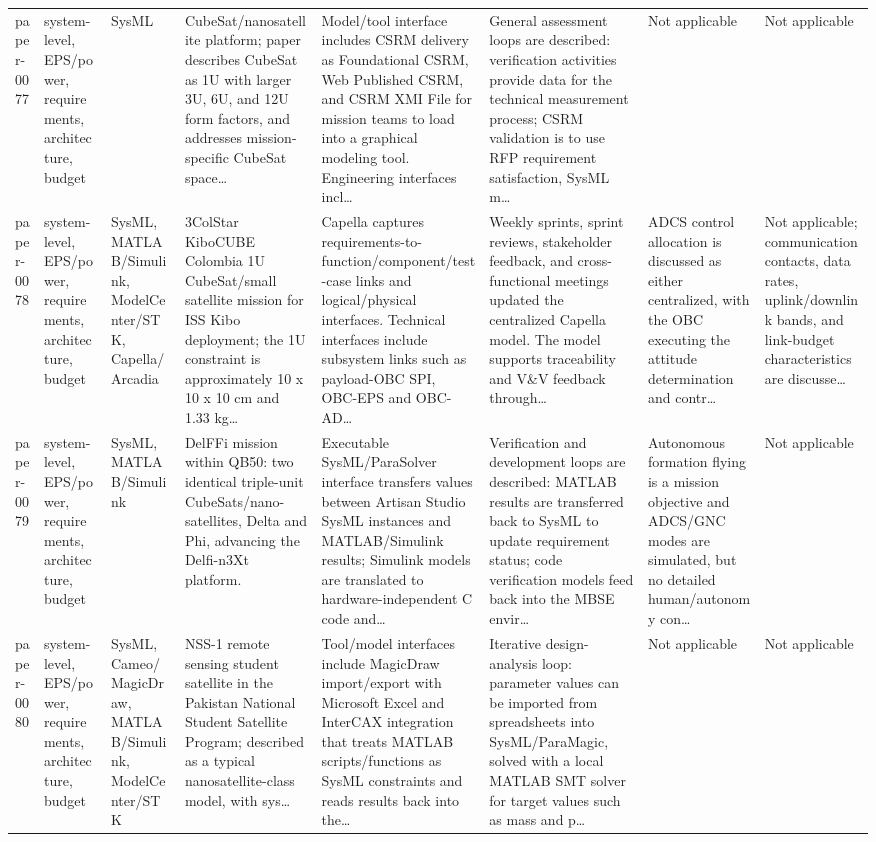 \documentclass[10pt]{article}
\begin{document}
\begin{landscape}
\begin{longtable}{p{1.1cm}p{3.1cm}p{2.5cm}p{3.3cm}p{4.0cm}p{3.5cm}p{2.8cm}p{2.8cm}}
paper-0077 & system-level, EPS/power, requirements, architecture, budget & SysML & CubeSat/nanosatellite platform; paper describes CubeSat as 1U with larger 3U, 6U, and 12U form factors, and addresses mission-specific CubeSat space… & Model/tool interface includes CSRM delivery as Foundational CSRM, Web Published CSRM, and CSRM XMI File for mission teams to load into a graphical modeling tool. Engineering interfaces incl… & General assessment loops are described: verification activities provide data for the technical measurement process; CSRM validation is to use RFP requirement satisfaction, SysML m… & Not applicable & Not applicable \\
paper-0078 & system-level, EPS/power, requirements, architecture, budget & SysML, MATLAB/Simulink, ModelCenter/STK, Capella/Arcadia & 3ColStar KiboCUBE Colombia 1U CubeSat/small satellite mission for ISS Kibo deployment; the 1U constraint is approximately 10 x 10 x 10 cm and 1.33 kg… & Capella captures requirements-to-function/component/test-case links and logical/physical interfaces. Technical interfaces include subsystem links such as payload-OBC SPI, OBC-EPS and OBC-AD… & Weekly sprints, sprint reviews, stakeholder feedback, and cross-functional meetings updated the centralized Capella model. The model supports traceability and V\&V feedback through… & ADCS control allocation is discussed as either centralized, with the OBC executing the attitude determination and contr… & Not applicable; communication contacts, data rates, uplink/downlink bands, and link-budget characteristics are discusse… \\
paper-0079 & system-level, EPS/power, requirements, architecture, budget & SysML, MATLAB/Simulink & DelFFi mission within QB50: two identical triple-unit CubeSats/nano-satellites, Delta and Phi, advancing the Delfi-n3Xt platform. & Executable SysML/ParaSolver interface transfers values between Artisan Studio SysML instances and MATLAB/Simulink results; Simulink models are translated to hardware-independent C code and… & Verification and development loops are described: MATLAB results are transferred back to SysML to update requirement status; code verification models feed back into the MBSE envir… & Autonomous formation flying is a mission objective and ADCS/GNC modes are simulated, but no detailed human/autonomy con… & Not applicable \\
paper-0080 & system-level, EPS/power, requirements, architecture, budget & SysML, Cameo/MagicDraw, MATLAB/Simulink, ModelCenter/STK & NSS-1 remote sensing student satellite in the Pakistan National Student Satellite Program; described as a typical nanosatellite-class model, with sys… & Tool/model interfaces include MagicDraw import/export with Microsoft Excel and InterCAX integration that treats MATLAB scripts/functions as SysML constraints and reads results back into the… & Iterative design-analysis loop: parameter values can be imported from spreadsheets into SysML/ParaMagic, solved with a local MATLAB SMT solver for target values such as mass and p… & Not applicable & Not applicable \\

\end{longtable}
\end{landscape}
\end{document}
